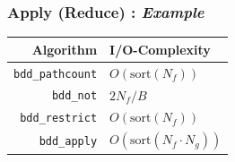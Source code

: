 \documentclass[english, aspectratio=169]{beamer}
\newcommand{\sort}[0]{\text{sort}}
\begin{document}
\begin{frame}
  \frametitle{Apply (Reduce) : \emph{Example}}

  
\end{frame}

\begin{frame}
  \begin{table}
    \centering
    \begin{tabular}{rl}
      Algorithm                 & I/O-Complexity
      \\ \hline \hline
      \lstinline{bdd_pathcount} & $O(\sort(N_f))$
      \\ \hline
      \lstinline{bdd_not}       & $2 N_f / B$
      \\
      \lstinline{bdd_restrict}  & $O(\sort(N_f))$
      \\
      \lstinline{bdd_apply}     & $O(\sort(N_f \cdot N_g))$
    \end{tabular}
  \end{table}
\end{frame}
\end{document}
